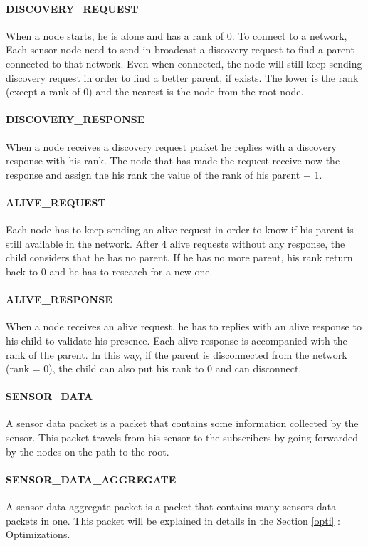 \documentclass[a4paper,10pt]{article}
\begin{document}
\paragraph{DISCOVERY\_REQUEST}  When a node starts, he is alone and has a rank of 0. To connect to a network, Each sensor node need to send in broadcast a discovery request to find a parent connected to that network. Even when connected, the node will still keep sending discovery request in order to find a better parent, if exists. The lower is the rank (except a rank of 0) and the nearest is the node from the root node.

\paragraph{DISCOVERY\_RESPONSE} When a node receives a discovery request packet he replies with a discovery response with his rank. The node that has made the request receive now the response and assign the his rank the value of the rank of his parent + 1.

\paragraph{ALIVE\_REQUEST} Each node has to keep sending an alive request in order to know if his parent is still available in the network. After 4 alive requests without any response, the child considers that he has no parent. If he has no more parent, his rank return back to 0 and he has to research for a new one. 

\paragraph{ALIVE\_RESPONSE } When a node receives an alive request, he has to replies with an alive response to his child to validate his presence. Each alive response is accompanied with the rank of the parent. In this way, if the parent is disconnected from the network (rank = 0), the child can also put his rank to 0 and can disconnect. 

\paragraph{SENSOR\_DATA } A sensor data packet is a packet that contains some information collected by the sensor. This packet travels from his sensor to the subscribers by going forwarded by the nodes on the path to the root.

\paragraph{SENSOR\_DATA\_AGGREGATE } A sensor data aggregate packet is a packet that contains many sensors data packets in one. This packet will be explained in details in the Section \ref{opti} : Optimizations.
\end{document}
